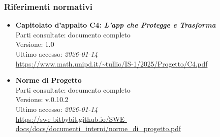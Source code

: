 \documentclass[a4paper,12pt]{article}
\begin{document}
\subsubsection{Riferimenti normativi}\label{sec:riferimenti_normativi}
\begin{itemize}
\item \textbf{Capitolato d'appalto C4: \emph{L'app che Protegge e Trasforma}}\\
Parti consultate: documento completo\\
Versione: 1.0\\
Ultimo accesso: \textit{2026-01-14}\\
\url{https://www.math.unipd.it/~tullio/IS-1/2025/Progetto/C4.pdf}

\pagebreak %

\item \textbf{Norme di Progetto}\\
Parti consultate: documento completo\\
Versione: v.0.10.2\\
Ultimo accesso: \textit{2026-01-14}\\
\url{https://swe-bitbybit.github.io/SWE-docs/docs/documenti_interni/norme_di_progetto.pdf} %
\end{itemize}
\end{document}
